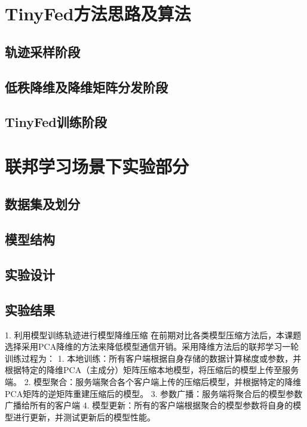 \section{TinyFed方法思路及算法}

\subsection{轨迹采样阶段}

\subsection{低秩降维及降维矩阵分发阶段}

\subsection{TinyFed训练阶段}


\section{联邦学习场景下实验部分}

\subsection{数据集及划分}

\subsection{模型结构}

\subsection{实验设计}

\subsection{实验结果}


1. 利用模型训练轨迹进行模型降维压缩
在前期对比各类模型压缩方法后，本课题选择采用PCA降维的方法来降低模型通信开销。采用降维方法后的联邦学习一轮训练过程为：
1. 本地训练：所有客户端根据自身存储的数据计算梯度或参数，并根据特定的降维PCA（主成分）矩阵压缩本地模型，将压缩后的模型上传至服务端。
2. 模型聚合：服务端聚合各个客户端上传的压缩后模型，并根据特定的降维PCA矩阵的逆矩阵重建压缩后的模型。
3. 参数广播：服务端将聚合后的模型参数广播给所有的客户端
4. 模型更新：所有的客户端根据聚合的模型参数将自身的模型进行更新，并测试更新后的模型性能。

